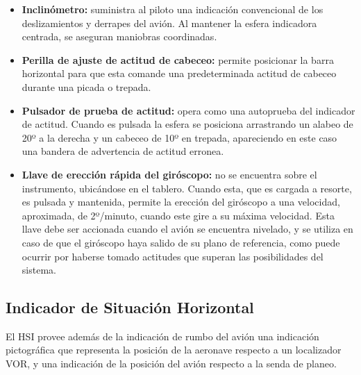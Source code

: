 \begin{itemize}
        \item {\bf Inclin\'ometro: }
	suministra al piloto una indicaci\'on convencional de los deslizamientos
	y derrapes del avi\'on. Al mantener la esfera indicadora centrada,
	se aseguran maniobras coordinadas.

        \item {\bf Perilla de ajuste de actitud de cabeceo: }
	permite posicionar la barra horizontal para que esta comande una
	predeterminada actitud de cabeceo durante una picada o trepada.

        \item {\bf Pulsador de prueba de actitud: }
	opera como una autoprueba del indicador de actitud. Cuando es pulsada
	la esfera se posiciona arrastrando un alabeo de 20º a la derecha
	y un cabeceo de 10º en trepada, apareciendo en este caso una bandera
	de advertencia de actitud erronea.

        \item {\bf Llave de erecci\'on r\'apida del gir\'oscopo: }
	no se encuentra sobre el instrumento, ubic\'andose en el tablero.
	Cuando esta, que es cargada a resorte, es pulsada y mantenida, 
	permite la erecci\'on del gir\'oscopo a una velocidad, aproximada,
	de 2º/minuto, cuando este gire a su m\'axima velocidad.
	Esta llave debe ser accionada cuando el avi\'on se encuentra
	nivelado, y se utiliza en caso de que el gir\'oscopo haya salido
	de su plano de referencia, como puede ocurrir por haberse tomado
	actitudes que superan las posibilidades del sistema.

\end{itemize}

\subsection{Indicador de Situaci\'on Horizontal}
\label{sec:indicador.situacion.horizontal}

El \ac{HSI} 
 provee adem\'as de la indicaci\'on de rumbo del avi\'on
una indicaci\'on pictogr\'afica que representa la posici\'on
de la aeronave respecto a un localizador VOR, y una indicaci\'on de la
posici\'on del avi\'on respecto a la senda de planeo.

